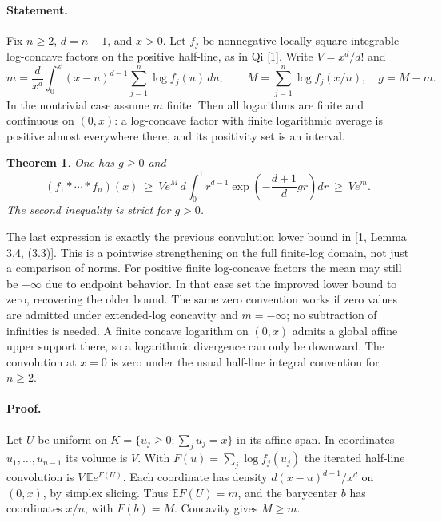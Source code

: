 \documentclass[11pt,a4paper]{article}
\numberwithin{equation}{section}
\newtheorem{theorem}{Theorem}[section]
\theoremstyle{definition}
\theoremstyle{remark}
\begin{document}
\paragraph{Statement.}
Fix $n\ge2$, $d=n-1$, and $x>0$. Let $f_j$ be nonnegative locally square-integrable log-concave factors on the positive half-line, as in Qi [1]. Write $V=x^d/d!$ and
\[
 m=\frac{d}{x^d}\int_0^x(x-u)^{d-1}\sum_{j=1}^n\log f_j(u)\,du,\qquad
 M=\sum_{j=1}^n\log f_j(x/n),\quad g=M-m.
\]
In the nontrivial case assume $m$ finite. Then all logarithms are finite and continuous on $(0,x)$: a log-concave factor with finite logarithmic average is positive almost everywhere there, and its positivity set is an interval.
\begin{theorem}
One has $g\ge0$ and
\[
 (f_1*\cdots*f_n)(x)\ \ge\
 V e^M\,d\int_0^1 r^{d-1}\exp\!\left(-\frac{d+1}{d}gr\right)dr
 \ \ge\ V e^m .
\]
The second inequality is strict for $g>0$.
\end{theorem}
The last expression is exactly the previous convolution lower bound in [1, Lemma 3.4, (3.3)]. This is a pointwise strengthening on the full finite-log domain, not just a comparison of norms. For positive finite log-concave factors the mean may still be $-\infty$ due to endpoint behavior. In that case set the improved lower bound to zero, recovering the older bound. The same zero convention works if zero values are admitted under extended-log concavity and $m=-\infty$; no subtraction of infinities is needed. A finite concave logarithm on $(0,x)$ admits a global affine upper support there, so a logarithmic divergence can only be downward. The convolution at $x=0$ is zero under the usual half-line integral convention for $n\ge2$.

\paragraph{Proof.}
Let $U$ be uniform on $K=\{u_j\ge0:\sum_j u_j=x\}$ in its affine span. In coordinates $u_1,\ldots,u_{n-1}$ its volume is $V$. With $F(u)=\sum_j\log f_j(u_j)$ the iterated half-line convolution is $V\,\mathbb E e^{F(U)}$. Each coordinate has density $d(x-u)^{d-1}/x^d$ on $(0,x)$, by simplex slicing. Thus $\mathbb EF(U)=m$, and the barycenter $b$ has coordinates $x/n$, with $F(b)=M$. Concavity gives $M\ge m$.
\end{document}
